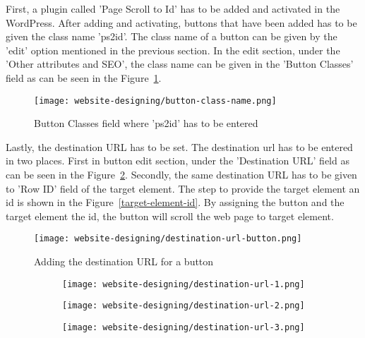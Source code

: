 First, a plugin called 'Page Scroll to Id' has to be added and activated in the WordPress. After adding and activating, buttons that have been added has to be given the class name 'ps2id'. The class name of a button can be given by the 'edit' option mentioned in the previous section. In the edit section, under the 'Other attributes and SEO', the class name can be given in the 'Button Classes' field as can be seen in the Figure~\ref{button-class-name}.

\begin{figure}[ht]
\centering
\caption{Button Classes field where 'ps2id' has to be entered}
\label{button-class-name}
\texttt{[image: website-designing/button-class-name.png]}
\end{figure}

Lastly, the destination URL has to be set. The destination \ac{url} has to be entered in two places. First in button edit section, under the 'Destination URL' field as can be seen in the Figure~\ref{destination-url-button}.  Secondly, the same destination URL has to be given to 'Row ID' field of the target element. The step to provide the target element an id is shown in the Figure~\ref{target-element-id}. By assigning the button and the target element the id, the button will scroll the web page to target element.

\begin{figure}[ht]
\centering
\caption{Adding the destination URL for a button}
\label{destination-url-button}
\texttt{[image: website-designing/destination-url-button.png]}
\end{figure}

\begin{figure}[ht]
\caption{Adding Row Id to the Target Element}
\label{target-element-id}
\centering
	\begin{subfigure}{.49\linewidth}
	\centering
	\texttt{[image: website-designing/destination-url-1.png]}
	\end{subfigure}
	\begin{subfigure}{0.49\linewidth}
	\centering
	\texttt{[image: website-designing/destination-url-2.png]}
	\end{subfigure}
	\begin{subfigure}{0.49\linewidth}
	\centering
	\texttt{[image: website-designing/destination-url-3.png]}
	\end{subfigure}
\end{figure}

